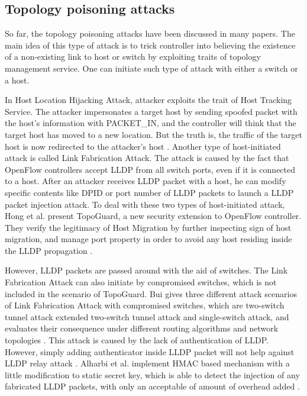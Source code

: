 \subsection{Topology poisoning attacks}
So far, the topology poisoning attacks have been discussed in many papers. The main idea of this type of attack is to trick controller into believing the existence of a non-existing link to host or switch by exploiting traits of topology management service. One can initiate such type of attack with either a switch or a host.

In Host Location Hijacking Attack, attacker exploits the trait of Host Tracking Service. The attacker impersonates a target host by sending spoofed packet with the host's information with PACKET\_IN, and the controller will think that the target host has moved to a new location. But the truth is, the traffic of the target host is now redirected to the attacker's host \cite{HXWG15}. Another type of host-initiated attack is called Link Fabrication Attack. The attack is caused by the fact that OpenFlow controllers accept LLDP from all switch ports, even if it is connected to a host. After an attacker receives LLDP packet with a host, he can modify specific contents like DPID or port number of LLDP packets to launch a LLDP packet injection attack. To deal with these two types of host-initiated attack, Hong et al. present TopoGuard, a new security extension to OpenFlow controller. They verify the legitimacy of Host Migration by further inspecting sign of host migration, and manage port property in order to avoid any host residing inside the LLDP propagation \cite{HXWG15}.

However, LLDP packets are passed around with the aid of switches. The Link Fabrication Attack can also initiate by compromised switches, which is not included in the scenario of TopoGuard. Bui gives three different attack scenarios of Link Fabrication Attack with compromised switches, which are two-switch tunnel attack extended two-switch tunnel attack and single-switch attack, and evaluates their consequence under different routing algorithms and network topologies \cite{TTB15}. This attack is caused by the lack of authentication of LLDP. However, simply adding authenticator inside LLDP packet will not help against LLDP relay attack \cite{HXWG15}. Alharbi et al. implement HMAC based mechanism with a little modification to static secret key, which is able to detect the injection of any fabricated LLDP packets, with only an acceptable of amount of overhead added \cite{ATPP15}.


